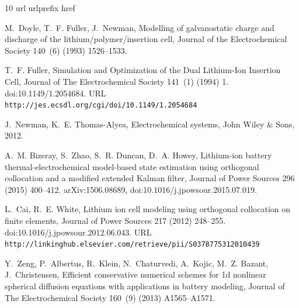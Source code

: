\documentclass[a4paper]{article}
\begin{document}
\begin{thebibliography}{10}
    \expandafter\ifx\csname url\endcsname\relax
      \def\url#1{\texttt{#1}}\fi
    \expandafter\ifx\csname urlprefix\endcsname\relax\def\urlprefix{URL }\fi
    \expandafter\ifx\csname href\endcsname\relax
      \def\href#1#2{#2} \def\path#1{#1}\fi
    
    M.~Doyle, T.~F. Fuller, J.~Newman, {Modelling of galvanostatic charge and
      discharge of the lithium/polymer/insertion cell}, Journal of the
      Electrochemical Society 140~(6) (1993) 1526--1533.
    
    T.~F. Fuller, \href{http://jes.ecsdl.org/cgi/doi/10.1149/1.2054684}{{Simulation
      and Optimization of the Dual Lithium-Ion Insertion Cell}}, Journal of The
      Electrochemical Society 141~(1) (1994) 1.
    \newblock \href {https://doi.org/10.1149/1.2054684}
      {\path{doi:10.1149/1.2054684}}.
    \newline\urlprefix\url{http://jes.ecsdl.org/cgi/doi/10.1149/1.2054684}
    
    J.~Newman, K.~E. Thomas-Alyea, {Electrochemical systems}, John Wiley {\&} Sons,
      2012.
    
    A.~M. Bizeray, S.~Zhao, S.~R. Duncan, D.~A. Howey, {Lithium-ion battery
      thermal-electrochemical model-based state estimation using orthogonal
      collocation and a modified extended Kalman filter}, Journal of Power Sources
      296 (2015) 400--412.
    \newblock \href {http://arxiv.org/abs/1506.08689} {\path{arXiv:1506.08689}},
      \href {https://doi.org/10.1016/j.jpowsour.2015.07.019}
      {\path{doi:10.1016/j.jpowsour.2015.07.019}}.
    
    L.~Cai, R.~E. White,
      \href{http://linkinghub.elsevier.com/retrieve/pii/S0378775312010439}{{Lithium
      ion cell modeling using orthogonal collocation on finite elements}}, Journal
      of Power Sources 217 (2012) 248--255.
    \newblock \href {https://doi.org/10.1016/j.jpowsour.2012.06.043}
      {\path{doi:10.1016/j.jpowsour.2012.06.043}}.
    \newline\urlprefix\url{http://linkinghub.elsevier.com/retrieve/pii/S0378775312010439}
    
    Y.~Zeng, P.~Albertus, R.~Klein, N.~Chaturvedi, A.~Kojic, M.~Z. Bazant,
      J.~Christensen, Efficient conservative numerical schemes for 1d nonlinear
      spherical diffusion equations with applications in battery modeling, Journal
      of The Electrochemical Society 160~(9) (2013) A1565--A1571.
    

\end{thebibliography}
\end{document}
